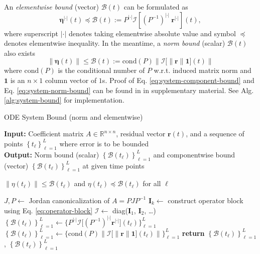 \documentclass[accepted]{uai2023}
\newcommand{\vect}[1]{\mathbf{#1}}
\newcommand{\Err}{\eta}
\newcommand{\Bound}{\mathcal{B}}
\newcommand{\I}{\mathcal{I}}
\newcommand{\abs}{|\cdot|}
\begin{document}
    An \textit{elementwise bound} (vector) $\pmb{\Bound}(t)$ can be formulated as 
    {
        \small
        \begin{equation}\label{eq:system-component-bound}
            \pmb{\Err}^{\abs}(t) \preceq \pmb{\Bound}(t) := P^{\abs} \pmb{\I}\left[(P^{-1})^{\abs} \ \vect{r}^{\abs}\right](t),
        \end{equation}
    }
    where superscript $\abs$ denotes taking elementwise absolute value and symbol $\preceq$ denotes elementwise inequality. In the meantime, a \textit{norm bound} (scalar) $\Bound(t)$ also exists
    {
        \small
        \begin{equation}\label{eq:system-norm-bound}
            \left\|\pmb{\Err}(t)\right\| \leq \Bound(t) := \mathrm{cond}(P)\left\|\pmb{\I}\big[\|\vect{r}\|\vect{1}\big](t)\right\|
        \end{equation}
    }
    where $\mathrm{cond}(P)$ is the conditional number of $P$ w.r.t. induced matrix norm and $\vect{1}$ is an $n\times 1$ column vector of $1$s. Proof of Eq. \ref{eq:system-component-bound} and Eq. \ref{eq:system-norm-bound} can be found in in supplementary material.
    See Alg. \ref{alg:system-bound} for implementation.

    \begin{algorithm}
        \small
        \caption{ODE System Bound (norm and elementwise)}\label{alg:system-bound}
        \textbf{Input:} Coefficient matrix $A \in \mathbb{R}^{n\times n}$, residual vector $\vect{r}(t)$, and a sequence of points $\left\{t_\ell\right\}_{\ell=1}^{L}$ where error is to be bounded\\
        \textbf{Output:} Norm bound (scalar) $\left\{\Bound(t_\ell)\right\}_{\ell=1}^{L}$ and componentwise bound (vector) $\left\{\pmb{\Bound}(t_\ell)\right\}_{\ell=1}^{L}$ at given time points
        \begin{algorithmic}
            \Ensure $\|\Err(t_\ell)\| \leq \Bound(t_\ell)$ and $\Err(t_\ell) \preceq \pmb{\Bound}(t_\ell)$ for all $\ell$

            \State $J, P \gets $ Jordan canonicalization of $A = PJP^{-1}$
                \State $\vect{I}_k \gets$ construct operator block using Eq. \ref{eq:operator-block} 
            \EndFor
            \State $\pmb{\I} \gets$ diag($\vect{I}_1$, $\vect{I}_2$,  \dots)
            \State $\left\{\pmb{\Bound}(t_\ell)\right\}_{\ell=1}^{L} \gets \{P^{\abs} \pmb{\I}\big[(P^{-1})^{\abs} \vect{r}^{\abs}\big](t_\ell)\}_{\ell=1}^{L}$
            \State $\left\{\Bound(t_\ell)\right\}_{\ell=1}^{L} \gets \{\mathrm{cond}(P)\left\|\pmb{\I}\big[\|\vect{r}\|\vect{1}\big](t_\ell)\right\|\}_{\ell=1}^{L}$
            \State \textbf{return} $\left\{\Bound(t_\ell)\right\}_{\ell=1}^{L}$, $\left\{\pmb{\Bound}(t_\ell)\right\}_{\ell=1}^{L}$
        \end{algorithmic}
    \end{algorithm}
\end{document}
